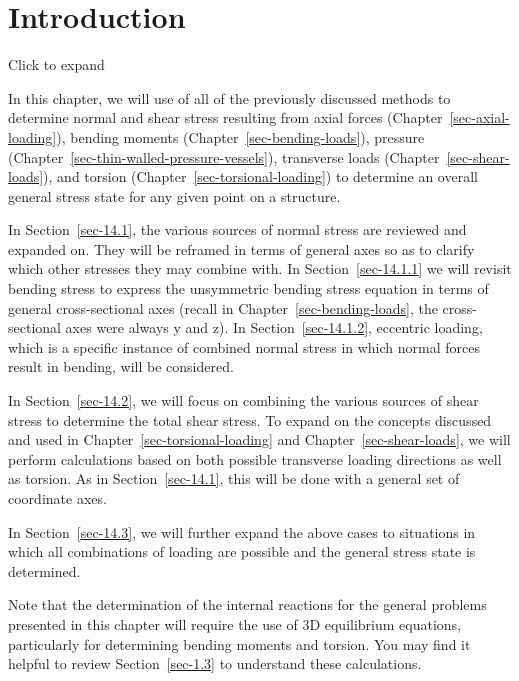 \documentclass[
  letterpaper,
  DIV=11,
  numbers=noendperiod]{scrreprt}
\theoremstyle{definition}
\theoremstyle{remark}
\begin{document}
\section*{Introduction}\label{introduction-13}


Click to expand

In this chapter, we will use of all of the previously discussed methods
to determine normal and shear stress resulting from axial forces
(Chapter~\ref{sec-axial-loading}), bending moments
(Chapter~\ref{sec-bending-loads}), pressure
(Chapter~\ref{sec-thin-walled-pressure-vessels}), transverse loads
(Chapter~\ref{sec-shear-loads}), and torsion
(Chapter~\ref{sec-torsional-loading}) to determine an overall general
stress state for any given point on a structure.

In Section~\ref{sec-14.1}, the various sources of normal stress are
reviewed and expanded on. They will be reframed in terms of general axes
so as to clarify which other stresses they may combine with. In
Section~\ref{sec-14.1.1} we will revisit bending stress to express the
unsymmetric bending stress equation in terms of general cross-sectional
axes (recall in Chapter~\ref{sec-bending-loads}, the cross-sectional
axes were always y and z). In Section~\ref{sec-14.1.2}, eccentric
loading, which is a specific instance of combined normal stress in which
normal forces result in bending, will be considered.

In Section~\ref{sec-14.2}, we will focus on combining the various
sources of shear stress to determine the total shear stress. To expand
on the concepts discussed and used in
Chapter~\ref{sec-torsional-loading} and Chapter~\ref{sec-shear-loads},
we will perform calculations based on both possible transverse loading
directions as well as torsion. As in Section~\ref{sec-14.1}, this will
be done with a general set of coordinate axes.

In Section~\ref{sec-14.3}, we will further expand the above cases to
situations in which all combinations of loading are possible and the
general stress state is determined.

Note that the determination of the internal reactions for the general
problems presented in this chapter will require the use of 3D
equilibrium equations, particularly for determining bending moments and
torsion. You may find it helpful to review Section~\ref{sec-1.3} to
understand these calculations.
\end{document}
